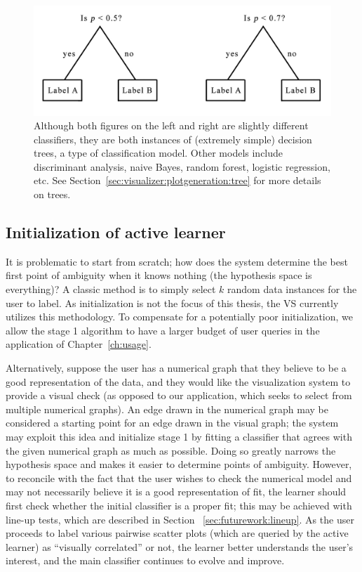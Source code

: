 \begin{figure}[htb]
	\begin{center}
		\includegraphics[width=0.75\linewidth]{ch-visualizer/figures/tree}
		\caption[Classifiers and classification models]{Although both figures 
		on the left and right are slightly different classifiers, they 
		are both instances of (extremely simple) decision trees, a type of 
		classification model. Other models include discriminant analysis, naive 
		Bayes, random forest, logistic regression, etc. 
		See Section~\ref{sec:visualizer:plotgeneration:tree} for more details 
		on trees.}
		\label{fig:visualizer:al:tree}
	\end{center}
\end{figure}

\subsection{Initialization of active learner}
\label{sec:visualizer:al:initialization}

It is problematic to start from scratch; how does the system determine
the best first point of ambiguity when it knows nothing (the hypothesis space is
everything)? A classic method is to simply select $k$ random data instances for 
the user to label. As initialization is not the focus of this thesis, the VS 
currently utilizes this methodology. To compensate for a potentially poor 
initialization, we allow the stage 1 algorithm to have a larger budget of user 
queries in the application of Chapter~\ref{ch:usage}.

Alternatively, suppose the user has a numerical graph that they believe to be a 
good representation of the data, and they would like the visualization system to
provide a visual check (as opposed to our application, which seeks to select 
from multiple numerical graphs). An edge drawn in the numerical graph may 
be considered a starting point for an edge drawn in the visual graph; the 
system may exploit this idea and initialize stage 1 by fitting a classifier 
that agrees with the given numerical graph as much as possible. 
Doing so greatly narrows the hypothesis space and makes it easier
to determine points of ambiguity. However, to reconcile with the fact that the
user wishes to check the numerical model and may not necessarily believe it is a
good representation of fit, the learner should first check whether the initial 
classifier is a proper fit; this may be achieved with line-up tests, which are 
described in Section ~\ref{sec:futurework:lineup}. As the user proceeds to 
label various pairwise scatter plots (which are queried by the active learner) 
as ``visually correlated'' or not, the learner better understands the
user’s interest, and the main classifier continues to evolve and improve.

